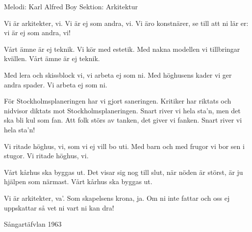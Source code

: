 \begin{song}

\begin{songmeta}
Melodi: Karl Alfred Boy
Sektion: Arkitektur
\end{songmeta}

\begin{songtext}
Vi är arkitekter, vi.
Vi är ej som andra, vi.
Vi äro konstnärer,
se till att ni lär er:
vi är ej som andra, vi!

Vårt ämne är ej teknik.
Vi kör med estetik.
Med nakna modellen
vi tillbringar kvällen.
Vårt ämne är ej teknik.

Med lera och skissblock vi,
vi arbeta ej som ni.
Med höghusens kader
vi ger andra spader.
Vi arbeta ej som ni.

För Stockholmsplaneringen
har vi gjort saneringen.
Kritiker har riktats
och nidvisor diktats
mot Stockholmsplaneringen.
\newpage
Snart river vi hela sta'n,
men det ska bli kul som fan.
Att folk störs av tanken,
det giver vi fanken.
Snart river vi hela sta'n!

Vi ritade höghus, vi,
som vi ej vill bo uti.
Med barn och med frugor
vi bor sen i stugor.
Vi ritade höghus, vi.

Vårt kårhus ska byggas ut.
Det visar sig nog till slut,
när nöden är störst,
är ju hjälpen som närmast.
Vårt kårhus ska byggas ut.

Vi är arkitekter, va'.
Som skapelsens krona, ja.
Om ni inte fattar
och oss ej uppskattar
så vet ni vart ni kan dra!
\end{songtext}

\begin{songnotes}
Sångartäfvlan 1963
\end{songnotes}
\end{song}
